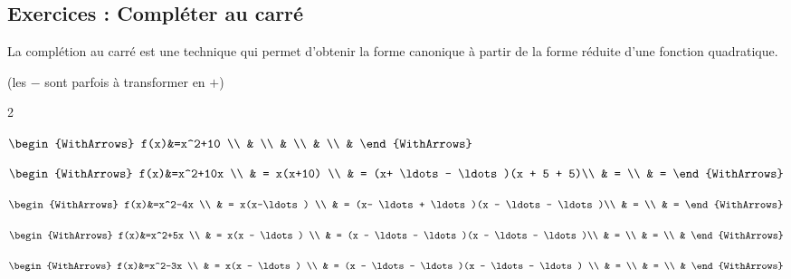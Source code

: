 \documentclass[main.tex]{subfiles}
\begin{document}
\newpage 
{}  
\pagestyle{scrheadings} %
\onehalfspacing
\subsection*{Exercices : Compléter au carré}
\begin{eBox}
	La complétion au carré est une technique qui permet d'obtenir la forme canonique à partir de la forme réduite d'une fonction quadratique.
\end{eBox}
\begin{example}[complétion au carré cas $a=1$](les $-$ sont parfois à transformer en $+$)\hfill

\begin{spacing}{2}	\large
\noindent
\parbox{0.18\linewidth}{
	\noindent
	$\begin{WithArrows}
		f(x)&=x^2+10  \\
		&    \\
		&   \\
		&  \\
		&  
	\end{WithArrows}$
}\hfill
\parbox{0.35\linewidth}{
\noindent
$\begin{WithArrows}
 f(x)&=x^2+10x \\
 & = x(x+10) \\
 & = (x+ \ldots - \ldots)(x + 5 + 5)\\
 & = \\
 & = 
\end{WithArrows}$
}\hfill
\parbox{0.4\linewidth}{
	\noindent
	$\begin{WithArrows}
		f(x)&=x^2-4x \\
		& = x(x-\ldots) \\
		& = (x- \ldots + \ldots)(x - \ldots - \ldots)\\
		& = \\
		& = 
	\end{WithArrows}$
}	\vspace{-0.5em}

\noindent
\parbox{0.45\linewidth}{
	\noindent
	$\begin{WithArrows}
		f(x)&=x^2+5x \\
		& = x(x - \ldots) \\
		& = (x - \ldots - \ldots)(x - \ldots - \ldots)\\
		& = \\
		& = \\
		&  
	\end{WithArrows}$
}	\hfill 
\parbox{0.45\linewidth}{
\noindent
$\begin{WithArrows}
	f(x)&=x^2-3x  \\
	& = x(x - \ldots)  \\
	& = (x - \ldots - \ldots)(x - \ldots - \ldots) \\
	& = \\
	& = \\
	&  
\end{WithArrows}$
} \vspace{-2em}


\end{spacing}
\end{example}
\end{document}

